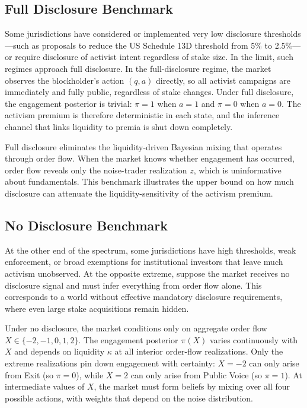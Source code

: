 \documentclass[11pt]{article}
\newcommand{\1}{\mathbf{1}}
\begin{document}
\subsection{Full Disclosure Benchmark}

Some jurisdictions have considered or implemented very low disclosure thresholds---such as proposals to reduce the US Schedule 13D threshold from 5\% to 2.5\%---or require disclosure of activist intent regardless of stake size. In the limit, such regimes approach full disclosure. In the full-disclosure regime, the market observes the blockholder's action $(q,a)$ directly, so all activist campaigns are immediately and fully public, regardless of stake changes. Under full disclosure, the engagement posterior is trivial: $\pi=1$ when $a=1$ and $\pi=0$ when $a=0$. The activism premium is therefore deterministic in each state, and the inference channel that links liquidity to premia is shut down completely.

Full disclosure eliminates the liquidity-driven Bayesian mixing that operates through order flow. When the market knows whether engagement has occurred, order flow reveals only the noise-trader realization $z$, which is uninformative about fundamentals. This benchmark illustrates the upper bound on how much disclosure can attenuate the liquidity-sensitivity of the activism premium.

\subsection{No Disclosure Benchmark}

At the other end of the spectrum, some jurisdictions have high thresholds, weak enforcement, or broad exemptions for institutional investors that leave much activism unobserved. At the opposite extreme, suppose the market receives no disclosure signal and must infer everything from order flow alone. This corresponds to a world without effective mandatory disclosure requirements, where even large stake acquisitions remain hidden.

Under no disclosure, the market conditions only on aggregate order flow $X\in\{-2,-1,0,1,2\}$. The engagement posterior $\pi(X)$ varies continuously with $X$ and depends on liquidity $\kappa$ at all interior order-flow realizations. Only the extreme realizations pin down engagement with certainty: $X=-2$ can only arise from Exit (so $\pi=0$), while $X=2$ can only arise from Public Voice (so $\pi=1$). At intermediate values of $X$, the market must form beliefs by mixing over all four possible actions, with weights that depend on the noise distribution.
\end{document}
